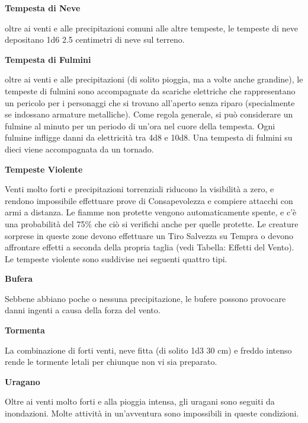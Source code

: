 \begin{multicols}{2}
\textbf{Tempesta di Neve}

oltre ai venti e alle precipitazioni comuni alle altre tempeste, le tempeste di neve depositano 1d6 \texttimes{} 2.5 centimetri di neve sul terreno.

\textbf{Tempesta di Fulmini}

oltre ai venti e alle precipitazioni (di solito pioggia, ma a volte anche grandine), le tempeste di fulmini sono accompagnate da scariche elettriche che rappresentano un pericolo per i personaggi che si trovano all'aperto senza riparo (specialmente se indossano armature metalliche). Come regola generale, si può considerare un fulmine al minuto per un periodo di un'ora nel cuore della tempesta. Ogni fulmine infligge danni da elettricità tra 4d8 e 10d8. Una tempesta di fulmini su dieci viene accompagnata da un tornado.

\textbf{Tempeste Violente}

Venti molto forti e precipitazioni torrenziali riducono la visibilità a zero, e rendono impossibile effettuare prove di Consapevolezza e compiere attacchi con armi a distanza. Le fiamme non protette vengono automaticamente spente, e c'è una probabilità del 75\% che ciò si verifichi anche per quelle protette. Le creature sorprese in queste zone devono effettuare un Tiro Salvezza su Tempra o devono affrontare effetti a seconda della propria taglia (vedi Tabella: Effetti del Vento). Le tempeste violente sono suddivise nei seguenti quattro tipi.




\textbf{Bufera}

Sebbene abbiano poche o nessuna precipitazione, le bufere possono provocare danni ingenti a causa della forza del vento.

\textbf{Tormenta}

La combinazione di forti venti, neve fitta (di solito 1d3 \texttimes{} 30 cm) e freddo intenso rende le tormente letali per chiunque non vi sia preparato.

\textbf{Uragano}

Oltre ai venti molto forti e alla pioggia intensa, gli uragani sono seguiti da inondazioni. Molte attività in un'avventura sono impossibili in queste condizioni.


\end{multicols}
